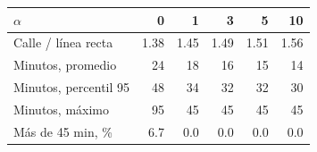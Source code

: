 \begin{tabular}{@{}lrrrrr@{}}
\toprule
$\alpha$ & 0 & 1 & 3 & 5 & 10 \\
\midrule
Calle / línea recta & 1.38 & 1.45 & 1.49 & 1.51 & 1.56 \\
Minutos, promedio & 24 & 18 & 16 & 15 & 14 \\
Minutos, percentil 95 & 48 & 34 & 32 & 32 & 30 \\
Minutos, máximo & 95 & 45 & 45 & 45 & 45 \\
Más de 45 min, \% & 6.7 & 0.0 & 0.0 & 0.0 & 0.0 \\
\bottomrule
\end{tabular}
